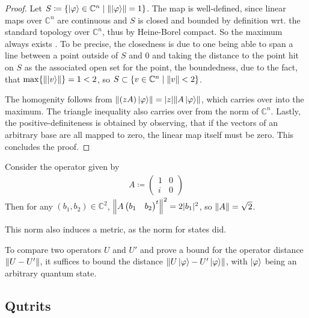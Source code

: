 \begin{proof}
    Let \(S \coloneqq \{\ket{\varphi} \in \mathbb{C}^n \mid \norm{\ket{\varphi}} = 1\}\). The map is well-defined, since linear maps over \(\mathbb{C}^n\) are continuous and \(S\) is closed and bounded by definition wrt. the standard topology over \(\mathbb{C}^n\), thus by Heine-Borel \cite[p. 41]{Forster2017} compact. So the maximum always exists \cite[p. 43]{Forster2017}. To be precise, the closedness is due to one being able to span a line between a point outside of \(S\) and \(0\) and taking the distance to the point hit on \(S\) as the associated open set for the point, the boundedness, due to the fact, that \(\max\{\norm{\ket{v}}\} = 1 < 2\), so \(S \subset \{v \in \mathbb{C}^n \mid \norm{v} < 2\}\).
    
    The homogenity follows from \(\norm{(zA)\ket{\varphi}} = |z|\norm{A\ket{\varphi}}\), which carries over into the maximum. The triangle inequality also carries over from the norm of \(\mathbb{C}^n\). Lastly, the positive-definiteness is obtained by observing, that if the vectors of an arbitrary base are all mapped to zero, the linear map itself must be zero. This concludes the proof.
\end{proof}

\begin{example}
    Consider the operator given by
    \begin{align}
        A \coloneqq \begin{pmatrix}
            1 & 0\\
            i & 0
        \end{pmatrix}
    \end{align}
    Then for any \((b_1, b_2) \in \mathbb{C}^2\), \(\norm{A \begin{pmatrix}b_1 & b_2\end{pmatrix}^t}^2 = 2|b_1|^2\), so \(\norm{A} = \sqrt{2}\).
\end{example}

This norm also induces a metric, as the norm for states did.

\begin{remark}
    To compare two operators \(U\) and \(U'\) and prove a bound for the operator distance \(\norm{U-U'}\), it suffices to bound the distance \(\norm{U\ket{\varphi}-U'\ket{\varphi}}\), with \(\ket{\varphi}\) being an arbitrary quantum state.
\end{remark}

\subsection{Qutrits } \label{subsection_qutrits}

